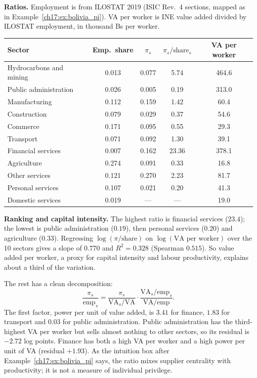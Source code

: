 \documentclass[../solutions_manual.tex]{subfiles}
\begin{document}
 \textbf{Ratios.} Employment is from ILOSTAT 2019 (ISIC Rev.~4 sections, mapped as in Example~\ref{ch17:ex:bolivia_pi}). VA per worker is INE value added divided by ILOSTAT employment, in thousand Bs per worker.
\begin{center}
\small
\begin{tabular}{lcccc}
\toprule
Sector & Emp.\ share & $\pi_s$ & $\pi_s/\text{share}_s$ & VA per worker \\
\midrule
Hydrocarbons and mining & 0.013 & 0.077 & 5.74 & 464.6 \\
Public administration & 0.026 & 0.005 & 0.19 & 313.0 \\
Manufacturing & 0.112 & 0.159 & 1.42 & 60.4 \\
Construction & 0.079 & 0.029 & 0.37 & 54.6 \\
Commerce & 0.171 & 0.095 & 0.55 & 29.3 \\
Transport & 0.071 & 0.092 & 1.30 & 39.1 \\
Financial services & 0.007 & 0.162 & 23.36 & 378.1 \\
Agriculture & 0.274 & 0.091 & 0.33 & 16.8 \\
Other services & 0.121 & 0.270 & 2.23 & 81.7 \\
Personal services & 0.107 & 0.021 & 0.20 & 41.3 \\
Domestic services & 0.019 & --- & --- & 19.0 \\
\bottomrule
\end{tabular}
\end{center}

 \textbf{Ranking and capital intensity.} The highest ratio is financial services ($23.4$); the lowest is public administration ($0.19$), then personal services ($0.20$) and agriculture ($0.33$). Regressing $\log(\pi/\text{share})$ on $\log(\text{VA per worker})$ over the 10 sectors gives a slope of $0.770$ and $R^2 = 0.328$ (Spearman $0.515$). So value added per worker, a proxy for capital intensity and labour productivity, explains about a third of the variation.

The rest has a clean decomposition:
\[
\frac{\pi_s}{\text{emp}_s} = \frac{\pi_s}{\text{VA}_s/\text{VA}}\cdot\frac{\text{VA}_s/\text{emp}_s}{\text{VA}/\text{emp}}.
\]
The first factor, power per unit of value added, is $3.41$ for finance, $1.83$ for transport and $0.03$ for public administration. Public administration has the third-highest VA per worker but sells almost nothing to other sectors, so its residual is $-2.72$ log points. Finance has both a high VA per worker and a high power per unit of VA (residual $+1.93$). As the intuition box after Example~\ref{ch17:ex:bolivia_pi} says, the ratio mixes supplier centrality with productivity; it is not a measure of individual privilege.
\end{document}
